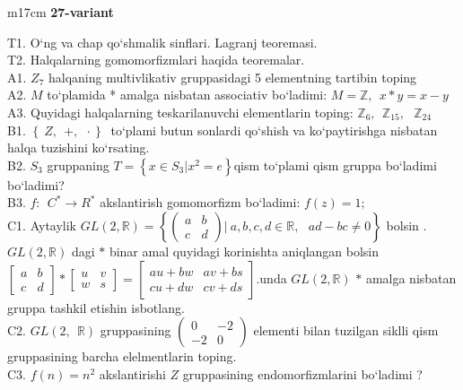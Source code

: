\documentclass{article}
\begin{document}
\begin{tabular}{m{17cm}}
\textbf{27-variant}
\newline

T1. O`ng va chap qo`shmalik sinflari. Lagranj teoremasi. \\
T2. Halqalarning gomomorfizmlari haqida teoremalar. \\
A1. \(Z_{7}\) halqaning multivlikativ gruppasidagi 5 elementning tartibin toping \\
A2. \(M\) to`plamida * amalga nisbatan associativ bo`ladimi: \(M\mathbb{= Z},\ \ x*y = x - y\) \\
A3. Quyidagi halqalarning teskarilanuvchi elementlarin toping: \(\mathbb{Z}_{6},\ \ \mathbb{Z}_{15},\ \ \ \mathbb{Z}_{24}\) \\
B1. \(\left\{ \left. \ Z,\ \  + ,\ \  \cdot \right\} \right.\ \) to`plami butun sonlardi qo`shish va ko`paytirishga nisbatan halqa tuzishini ko`rsating. \\
B2. \(S_{3}\) gruppaning \(T = \left\{ x \in S_{3}|x^{2} = e \right\}\)qism to`plami qism gruppa bo`ladimi bo`ladimi? \\
B3. \(f:\ \ C^{*} \rightarrow R^{*}\) akslantirish gomomorfizm bo`ladimi: \(f(z) = 1;\) \\
C1. Aytaylik \(GL(2,\mathbb{R}) = \left\{ \begin{pmatrix}
a & b \\
c & d
\end{pmatrix}|\ a,b,c,d\mathbb{\in R},\ \ \ ad - bc \neq 0 \right\}\) bo\textquotesingle lsin . \(GL(2,\mathbb{R})\) dagi \(*\) binar amal quyidagi ko\textquotesingle rinishta aniqlangan bo\textquotesingle lsin \(\begin{bmatrix}
a & b \\
c & d
\end{bmatrix}*\begin{bmatrix}
u & v \\
w & s
\end{bmatrix} = \begin{bmatrix}
au + bw & av + bs \\
cu + dw & cv + ds
\end{bmatrix}\).unda \(GL(2,\mathbb{R})\) \(*\) amalga nisbatan gruppa tashkil etishin isbotlang. \\
C2. \(GL(2,\mathbb{\ \ R})\) gruppasining \(\begin{pmatrix}
0 & - 2 \\
 - 2 & 0
\end{pmatrix}\) elementi bilan tuzilgan siklli qism gruppasining barcha elelmentlarin toping. \\
C3. \(f(n) = n^{2}\) akslantirishi \(Z\) gruppasining endomorfizmlarini bo`ladimi ? \\

\end{tabular}
\vspace{1cm}
\end{document}
